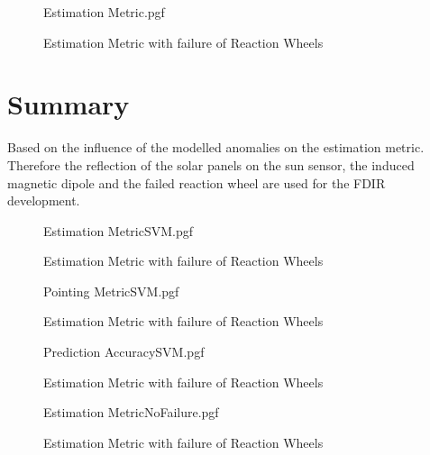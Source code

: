 \begin{figure}[!htb]
\centering

{Estimation Metric.pgf}

\caption{Estimation Metric with failure of Reaction Wheels}
\label{fig:catastrophicReactionWheels}
\end{figure}

\section{Summary}
Based on the influence of the modelled anomalies on the estimation metric. Therefore the reflection of the solar panels on the sun sensor, the induced magnetic dipole and the failed reaction wheel are used for the FDIR development.

\begin{figure}[!htb]
	\centering
	
	{Estimation MetricSVM.pgf}
	
	\caption{Estimation Metric with failure of Reaction Wheels}
	\label{fig:catastrophicReactionWheels}
\end{figure}

\begin{figure}[!htb]
	\centering
	
	{Pointing MetricSVM.pgf}
	
	\caption{Estimation Metric with failure of Reaction Wheels}
	\label{fig:catastrophicReactionWheels}
\end{figure}

\begin{figure}[!htb]
	\centering
	
	{Prediction AccuracySVM.pgf}
	
	\caption{Estimation Metric with failure of Reaction Wheels}
	\label{fig:catastrophicReactionWheels}
\end{figure}


\begin{figure}[!htb]
	\centering
	
	{Estimation MetricNoFailure.pgf}
	
	\caption{Estimation Metric with failure of Reaction Wheels}
	\label{fig:catastrophicReactionWheels}
\end{figure}


